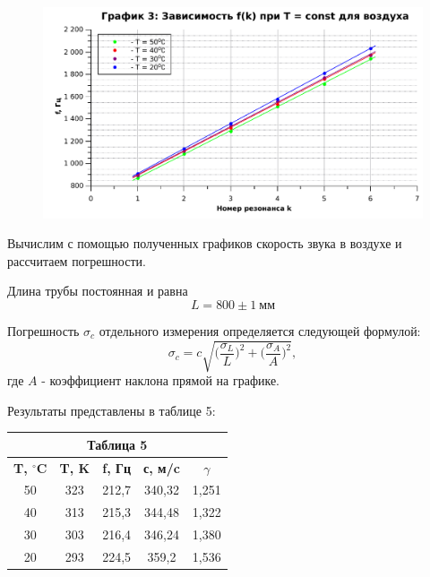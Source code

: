 \documentclass[11pt,a4paper,oneside]{article}
\begin{document}
\begin{enumerate}
\begin{figure}[h!]
\centering
\includegraphics[scale=0.65]{Graph3.pdf}
\end{figure}
	\newpage
	Вычислим с помощью полученных графиков скорость звука в воздухе и рассчитаем погрешности.

	Длина трубы постоянная и равна $$L = 800 \pm 1 \: мм$$

	Погрешность $\sigma_{c}$ отдельного измерения определяется следующей формулой:
	$$ \sigma_{c} =c \sqrt{\Big(\frac{\sigma_{L}}{L}\Big)^2+ \Big(\frac{\sigma_{A}}{A}\Big)^2},$$
	где $A$ - коэффициент наклона прямой на графике.

	Результаты представлены в таблице 5:


\begin{table}[h!]
\centering
\begin{tabular}{|c|c|l|c|l|}
\multicolumn{5}{c}{\textbf{Таблица 5}}                                                                                               \\ \hline
\textbf{T, $^{\circ}$C} & \textbf{T, K} & \multicolumn{1}{c|}{\textbf{f, Гц}} & \textbf{с, м/c} & \multicolumn{1}{c|}{\textbf{$\gamma$}} \\ \hline
50                     & 323           & 212,7                               & 340,32          & 1,251                                  \\ \hline
40                     & 313           & 215,3                               & 344,48          & 1,322                                  \\ \hline
30                     & 303           & 216,4                               & 346,24          & 1,380                                  \\ \hline
20                     & 293           & 224,5                               & 359,2           & 1,536                                  \\ \hline
\end{tabular}


\end{table}
\end{enumerate}
\end{document}
